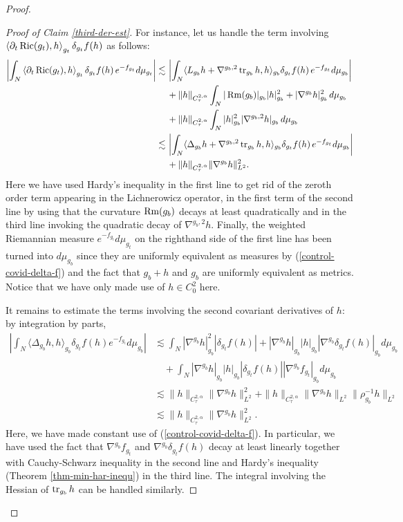 \documentclass[a4paper,11pt,reqno]{amsart}
\def\Ric{\mathop{\rm Ric}\nolimits}
\def\Rm{\mathop{\rm Rm}\nolimits}
\def\tr{\mathop{\rm tr}\nolimits}
\def\Ric{\mathop{\rm Ric}\nolimits}
\def\Rm{\mathop{\rm Rm}\nolimits}
\def\tr{\mathop{\rm tr}\nolimits}
\numberwithin{equation}{section}
\begin{document}
\begin{proof}
\begin{proof}[Proof of Claim \ref{third-der-est}]
			For instance, let us handle the term involving $\left<\partial_t\Ric(g_t),h\right>_{g_t}\delta_{g_t}f(h)$ as follows:
			\begin{equation*}
			\begin{split}
			\left|\int_N\left<\partial_t\Ric(g_t),h\right>_{g_t}\delta_{g_t}f(h)\,e^{-f_{g_t}}d\mu_{g_t}\right|\lesssim\,&\left|\int_N\langle L_{g_b}h+\nabla^{g_b,2}\tr_{g_b}h,h\rangle_{g_b}\delta_{g_t}f(h)\,e^{-f_{g_t}}d\mu_{g_b}\right|\\
			&+\|h\|_{C^{2,\alpha}_{\tau}}\int_N |\Rm(g_b)|_{g_b}|h|^2_{g_b}+|\nabla^{g_b}h|^2_{g_b}\,d\mu_{g_b}\\
			&+\|h\|_{C^{2,\alpha}_{\tau}}\int_N|h|^2_{g_b}|\nabla^{g_b,2}h|_{g_b}\,d\mu_{g_b}\\
			\lesssim\,&\left|\int_N\langle \Delta_{g_b}h+\nabla^{g_b,2}\tr_{g_b}h,h\rangle_{g_b}\delta_{g_t}f(h)\,e^{-f_{g_t}}d\mu_{g_b}\right|\\
			&+\|h\|_{C^{2,\alpha}_{\tau}}\|\nabla^{g_b}h\|_{L^2}^2.
			\end{split}
			\end{equation*}
			Here we have used Hardy's inequality in the first line to get rid of the zeroth order term appearing in the Lichnerowicz operator, in the first term of the second line by using that the curvature $\Rm(g_b)$ decays at least quadratically and in the third line invoking the quadratic decay of $\nabla^{g_b,2}h$. Finally, the weighted Riemannian measure $e^{-f_{g_t}}d\mu_{g_t}$ on the righthand side of the first line has been turned into $d\mu_{g_b}$ since they are uniformly equivalent as measures by (\ref{control-covid-delta-f}) and the fact that $g_b+h$ and $g_b$ are uniformly equivalent as metrics. Notice that we have only made use of $h\in C^2_0$ here.
			
			
			It remains to estimate the terms involving the second covariant derivatives of $h$: by integration by parts, 
			\begin{equation*}
			\begin{split}
			\left|\int_N\langle \Delta_{g_b}h,h\rangle_{g_b}\delta_{g_t}f(h)e^{-f_{g_t}}d\mu_{g_b}\right|&\lesssim\int_N |\nabla^{g_b}h|^2_{g_b}|\delta_{g_t}f(h)|+|\nabla^{g_b}h|_{g_b}|h|_{g_b}|\nabla^{g_b}\delta_{g_t}f(h)|_{g_b}d\mu_{g_b}\\
			&\quad+\int_N|\nabla^{g_b}h|_{g_b}|h|_{g_b}|\delta_{g_t}f(h)||\nabla^{g_b}f_{g_t}|_{g_b}d\mu_{g_b}\\
			&\lesssim \|h\|_{C^{2,\alpha}_{\tau}}\|\nabla^{g_b}h\|_{L^2}^2+\|h\|_{C^{2,\alpha}_{\tau}}\|\nabla^{g_b}h\|_{L^2}\|\rho_{g_b}^{-1}h\|_{L^2}\\
			&\lesssim \|h\|_{C^{2,\alpha}_{\tau}}\|\nabla^{g_b}h\|_{L^2}^2.
			\end{split}
			\end{equation*}
			Here, we have made constant use of (\ref{control-covid-delta-f}). In particular, we have used the fact that $\nabla^{g_b}f_{g_t}$ and $\nabla^{g_b}\delta_{g_t}f(h)$ decay at least linearly together with Cauchy-Schwarz inequality in the second line and Hardy's inequality (Theorem \ref{thm-min-har-inequ}) in the third line. The integral involving the Hessian of $\tr_{g_b}h$ can be handled similarly.
			

\end{proof}
\end{proof}
\end{document}
